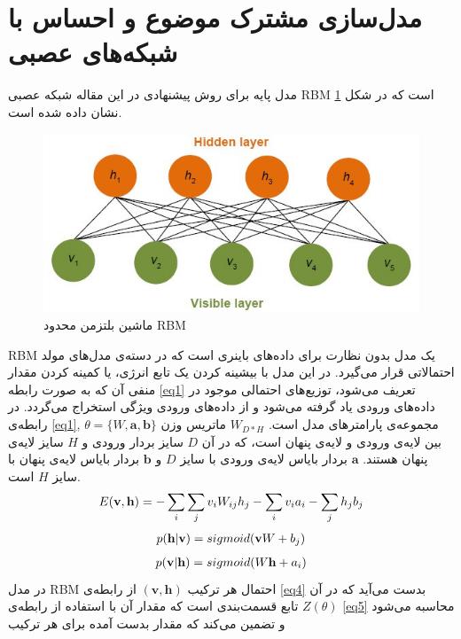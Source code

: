 \documentclass[12pt,a4paper]{article}
\begin{document}
\section{مدل‌سازی مشترک موضوع و احساس با شبکه‌های عصبی}
\label{sec3}

مدل پایه برای روش پیشنهادی در این مقاله  شبکه عصبی RBM است که در شکل
\ref{fig1}
نشان داده شده است.
\begin{figure}[!t]
	\centering
	\includegraphics[scale=0.5]{images/RBM}
	\caption{ماشین بلتزمن محدود RBM}
	\label{fig1}
\end{figure}
RBM 
یک مدل بدون نظارت برای داده‌های باینری است که در دسته‌ی مدل‌های مولد احتمالاتی  قرار می‌گیرد. در این مدل با بیشینه کردن یک تابع انرژی، یا کمینه کردن مقدار منفی‌ آن که به صورت رابطه
\ref{eq1}
تعریف می‌‌شود، توزیع‌های احتمالی‌ موجود در داده‌های ورودی یاد گرفته می‌شود و از داده‌های ورودی ویژگی‌ استخراج می‌‌گردد. در رابطه‌ی
\ref{eq1}, $\theta = \{W, \textbf{a}, \textbf{b}\}$
مجموعه‌ی پارامترهای مدل است.
$W_{D*H}$
ماتریس وزن بین لایه‌ی ورودی و لایه‌ی پنهان است، که در آن
$D$
سایز بردار ورودی و
$H$
سایز لایه‌ی پنهان هستند.
$\textbf{a}$
بردار بایاس لایه‌ی ورودی با سایز
$D$
و
$\textbf{b}$
بردار بایاس لایه‌ی پنهان با سایز
$H$
است. 
\begin{align}
\centering
\label{eq1}
E(\textbf{v},\textbf{h}) = -\sum_{i} \sum_{j} v_iW_{ij}h_j - \sum_i v_ia_i - \sum_j h_jb_j
\end{align}
\begin{align}
\centering
\label{eq2}
p(\textbf{h}|\textbf{v})=sigmoid(\textbf{v}W + b_j)
\end{align}
\begin{align}
\centering
\label{eq3}
p(\textbf{v}|\textbf{h})=sigmoid(W\textbf{h} + a_i)
\end{align}
در مدل RBM احتمال هر ترکیب
$(\textbf{v},\textbf{h})$
از رابطه‌ی
\ref{eq4}
بدست می‌‌آید که در آن
$Z(\theta)$
تابع قسمت‌بندی است که مقدار آن با استفاده از رابطه‌ی 
\ref{eq5}
محاسبه می‌شود و تضمین می‌کند که مقدار بدست آمده برای هر ترکیب
\end{document}
